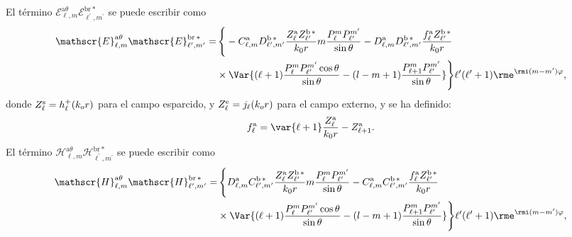 
El término $\mathscr{E}_{\ell, m}^{\text{a}\theta}\mathscr{E}_{\ell^{\prime}, m^{\prime}}^{\text{br}\,*}$ se puede escribir como
\begin{align}
\mathscr{E}_{\ell, m}^{\text{a}\theta}\mathscr{E}_{\ell^{\prime}, m^{\prime}}^{\text{br}\,*}=& \, \Bigg\{-C_{\ell,m}^{\rm a}D_{\ell^{\prime}, m^{\prime}}^{\rm b \, *}\frac{Z_{\ell}^{\rm a}Z_{\ell^{\prime}}^{\rm b\, *}}{k_0 r} m \frac{P_{\ell}^{m}P_{\ell^{\prime}}^{m^{\prime}}}{\sin\theta}-D_{\ell, m}^{\rm a}D_{\ell^{\prime}, m^{\prime}}^{\rm b \, *} \frac{f_{\ell}^{\rm a}Z_{\ell^{\prime}}^{\rm b \, *}}{k_0 r}\nonumber\\
& \times \Var{(\ell+1) \frac{P_{\ell}^m P_{\ell^{\prime}}^{m^{\prime}}\cos\theta}{\sin\theta}-(l-m+1)\frac{P_{\ell+1}^{m}P_{\ell^{\prime}}^{m^{\prime}}}{\sin\theta}}\Bigg\}\ell^{\prime}(\ell^{\prime}+1)  \rme^{\rmi (m-m^{\prime})\varphi },
\end{align}
donde $Z_{\ell}^{\rm s}=h_{\ell}^{+}(k_o r)$ para el campo esparcido, y $Z_{\ell}^{\rm e}=j_{\ell}(k_o r)$ para el campo externo, y se ha definido:
\begin{equation}
f_{\ell}^{\rm a}= \var{\ell + 1} \frac{Z_{\ell}^{\rm a}}{k_0 r}-Z_{\ell+1}^{\rm a}.
\end{equation}
%
El término $\mathscr{H}_{\ell, m}^{\text{a}\theta}\mathscr{H}_{\ell^{\prime}, m^{\prime}}^{\text{br}\,*}$ se puede escribir como
\begin{align}
\mathscr{H}_{\ell, m}^{\text{a}\theta}\mathscr{H}_{\ell^{\prime}, m^{\prime}}^{\text{br}\,*}=& \, \Bigg\{ D_{\ell,m}^{\rm a}C_{\ell^{\prime}, m^{\prime}}^{\rm b \, *}\frac{Z_{\ell}^{\rm a}Z_{\ell^{\prime}}^{\rm b\, *}}{k_0 r} m \frac{P_{\ell}^{m}P_{\ell^{\prime}}^{m^{\prime}}}{\sin\theta}-C_{\ell, m}^{\rm a}C_{\ell^{\prime}, m^{\prime}}^{\rm b \, *} \frac{f_{\ell}^{\rm a}Z_{\ell^{\prime}}^{\rm b \, *}}{k_0 r}\nonumber\\
& \times \Var{(\ell+1) \frac{P_{\ell}^m P_{\ell^{\prime}}^{m^{\prime}}\cos\theta}{\sin\theta}-(l-m+1)\frac{P_{\ell+1}^{m}P_{\ell^{\prime}}^{m^{\prime}}}{\sin\theta}}\Bigg\}\ell^{\prime}(\ell^{\prime}+1)  \rme^{\rmi (m-m^{\prime})\varphi },
\end{align}
